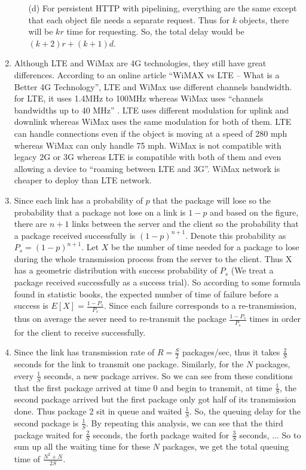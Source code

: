 \documentclass[12pt]{article}
\begin{document}
\begin{singlespace}
\begin{enumerate}
\begin{itemize}
	\item[(d)] For persistent HTTP with pipelining, everything are the same except that each object file needs a separate request. Thus for $k$ objects, there will be $k r$ time for requesting. So, the total delay would be $(k+2)r + (k+1)d$.
	\end{itemize}
\item
	Although LTE and WiMax are 4G technologies, they still have great differences. According to an online article ``WiMAX vs LTE – What is a Better 4G Technology'', LTE and WiMax use different channels bandwidth. for LTE, it uses 1.4MHz to 100MHz whereas WiMax uses ``channels bandwidths up to 40 MHz'' \cite{wvlw}. LTE uses different modulation for uplink and downlink whereas WiMax uses the same modulation for both of them. LTE can handle connections even if the object is moving at a speed of 280 mph whereas WiMax can only handle 75 mph. WiMax is not compatible with legacy 2G or 3G whereas LTE is compatible with both of them and even allowing a device to ``roaming between LTE and 3G''. WiMax network is cheaper to deploy than LTE network\cite{wvlw}.
\item 
	Since each link has a probability of $p$ that the package will lose so the probability that a package not lose on a link is $1-p$ and based on the figure, there are $n+1$ links between the server and the client so the probability that a package received successfully is $(1-p)^{n+1}$. Denote this probability as $P_s = (1-p)^{n+1}$. Let $X$ be the number of time needed for a package to lose during the whole transmission process from the server to the client. Thus X has a geometric distribution with success probability of $P_s$ (We treat a package received successfully as a success trial). So according to some formula found in statistic books, the expected number of time of failure before a success is $E[X] = \frac{1-P_s}{P_s}$. Since each failure corresponds to a re-transmission, thus on average the sever need to re-transmit the package $\frac{1-P_s}{P_s}$ times in order for the client to receive successfully.
\item
	Since the link has transmission rate of $R = \frac{S}{2}$ packages/sec, thus it takes $\frac{2}{S}$ seconds for the link to transmit one package. Similarly, for the $N$ packages, every $\frac{1}{S}$ seconds, a new package arrives. So we can see from these conditions that the first package arrived at time 0 and begin to transmit, at time $\frac{1}{S}$, the second package arrived but the first package only got half of its transmission done. Thus package 2 sit in queue and waited $\frac{1}{S}$. So, the queuing delay for the second package is $\frac{1}{S}$. By repeating this analysis, we can see that the third package waited for $\frac{2}{S}$ seconds, the forth package waited for $\frac{3}{S}$ seconds, ... So to sum up all the waiting time for these $N$ packages, we get the total queuing time of $\frac{N^2+N}{2S}$.

\end{enumerate}
\end{singlespace}
\end{document}
